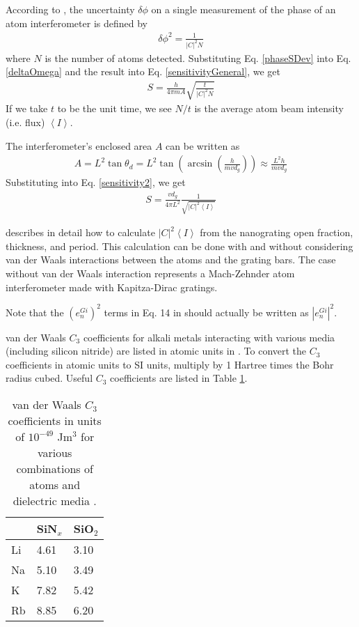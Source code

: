 \documentclass[twocolumn,pra,showpacs,superscriptaddress,longbibliography]{revtex4-1}   %
\newcommand{\avg}[1]{\left\langle #1 \right\rangle}
\begin{document}
According to \cite{Lenef1997}, the uncertainty $\delta\phi$ on a single measurement of the phase of an atom interferometer is defined by
\begin{align}
	\delta\phi^2 = \frac{1}{|C|^2N}
	\label{phaseSDev}
\end{align}
where $N$ is the number of atoms detected.
Substituting Eq. \ref{phaseSDev} into Eq. \ref{deltaOmega} and the result into Eq. \ref{sensitivityGeneral}, we get 
\begin{align}
	S = \frac{h}{4\pi m A} \sqrt{\frac{t}{|C|^2N}}
	\label{sensitivity2}
\end{align}
If we take $t$ to be the unit time, we see $N/t$ is the average atom beam intensity (i.e. flux) $\avg{I}$.

The interferometer's enclosed area $A$ can be written as
\begin{align}
	A = L^2\tan{\theta_d} = L^2\tan\left(\arcsin\left(\frac{h}{mvd_g}\right)\right) \approx \frac{L^2h}{mvd_g}
\end{align}
Substituting into Eq. \ref{sensitivity2}, we get
\begin{align}
	S = \frac{vd_g}{4\pi L^2} \frac{1}{ \sqrt{|C|^2\avg{I}}}
	\label{sensitivity3}
\end{align}


\cite{Cronin2005} describes in detail how to calculate $|C|^2\avg{I}$ from the nanograting open fraction, thickness, and period. This calculation can be done with and without considering van der Waals interactions between the atoms and the grating bars. The case without van der Waals interaction represents a Mach-Zehnder atom interferometer made with Kapitza-Dirac gratings.

Note that the $\left(e_n^{Gi}\right)^2$ terms in Eq. 14 in \cite{Cronin2005} should actually be written as $\left|e_n^{Gi}\right|^2$.

van der Waals $C_3$ coefficients for alkali metals interacting with various media (including silicon nitride) are listed in atomic units in \cite{Arora2014}. To convert the $C_3$ coefficients in atomic units to SI units, multiply by 1 Hartree times the Bohr radius cubed. Useful $C_3$ coefficients are listed in Table \ref{tableC3}.

\begingroup
\begin{table}
\caption{\label{tableC3} van der Waals $C_3$ coefficients in units of $10^{-49}$ Jm$^3$ for various combinations of atoms and dielectric media \cite{Arora2014}.}
\begin{center}
\begin{tabular}{l|ll}
\hline\hline
& SiN$_x$ & SiO$_2$ \\
\hline
Li & 4.61 & 3.10 \\
Na & 5.10 & 3.49 \\
K &  7.82 & 5.42 \\
Rb & 8.85 & 6.20 \\
\hline\hline
\end{tabular}
\end{center}
\end{table}
\endgroup


\end{document}
